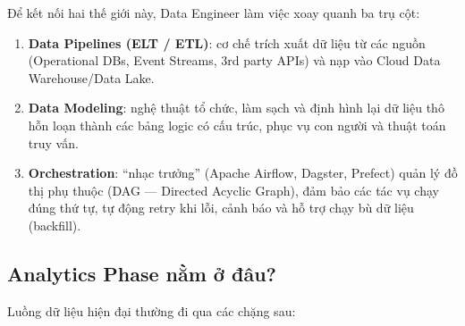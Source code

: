 \documentclass[12pt]{article}
\begin{document}
Để kết nối hai thế giới này, Data Engineer làm việc xoay quanh ba trụ cột:
\begin{enumerate}
    \item \textbf{Data Pipelines (ELT / ETL)}: cơ chế trích xuất dữ liệu từ các nguồn (Operational DBs, Event Streams, 3rd party APIs) và nạp vào Cloud Data Warehouse/Data Lake.
    \item \textbf{Data Modeling}: nghệ thuật tổ chức, làm sạch và định hình lại dữ liệu thô hỗn loạn thành các bảng logic có cấu trúc, phục vụ con người và thuật toán truy vấn.
    \item \textbf{Orchestration}: ``nhạc trưởng'' (Apache Airflow, Dagster, Prefect) quản lý đồ thị phụ thuộc (DAG --- Directed Acyclic Graph), đảm bảo các tác vụ chạy đúng thứ tự, tự động retry khi lỗi, cảnh báo và hỗ trợ chạy bù dữ liệu (backfill).
\end{enumerate}

\subsection{Analytics Phase nằm ở đâu?}

Luồng dữ liệu hiện đại thường đi qua các chặng sau:
\begin{figure}[H]
\centering
{}
\end{figure}
\end{document}

